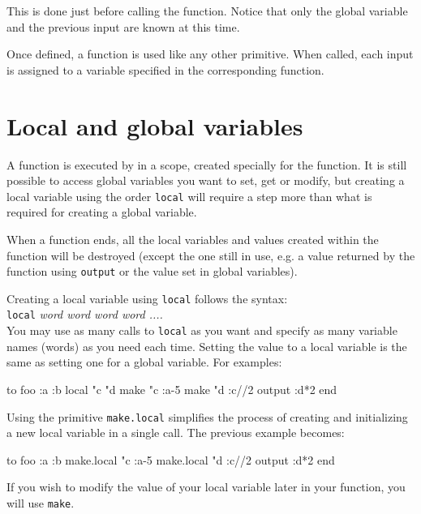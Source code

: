 This is done just before calling the function.  Notice that only the global variable and the previous input are known at this time. 
 
Once defined, a function is used like any other \squirrel primitive. When called, each input is assigned to a variable specified in the corresponding function. 
 
\section{Local and global variables} 
 
A function is executed by \squirrel in a scope, created specially for the function.  It is still possible to access global variables you want to set, get or modify, but creating a local variable using the order {\tt local} will 
require a step more than what is required for creating a global variable. 
 
When a function ends, all the local variables and values created within the function will be destroyed 
(except the one still in use, e.g. a value returned by the function using {\tt output} or the value set in global variables). 
 
Creating a local variable using {\tt local} follows the syntax:\\
 
{\tt local} {\it word word word word ....} \\

You may use as many calls to {\tt local} as you want and specify as many variable names (words) as you need each time. Setting the value to a local variable is the same as setting one for a global variable. For examples: 
 
\begin{verbatimtab}  
to foo :a :b
	local "c "d
	make "c :a-5
	make "d :c//2
	output :d*2
end 
\end{verbatimtab}

Using the primitive {\tt make.local} simplifies the process of creating and initializing a new local variable in a single call. The previous example becomes:

\begin{verbatimtab}
to foo :a :b
	make.local "c :a-5
	make.local "d :c//2
	output :d*2
end 
\end{verbatimtab}

If you wish to modify the value of your local variable later in your function, you will use {\tt make}.\\


